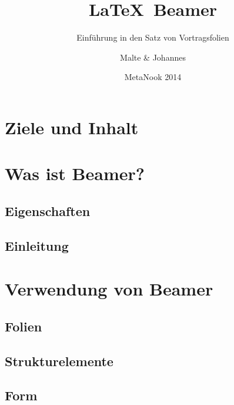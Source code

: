 \title{\LaTeX\ Beamer}
\subtitle{Einführung in den Satz von Vortragsfolien}
\author{Malte \& Johannes}
\date{MetaNook 2014}


  \section*{Ziele und Inhalt}

  \frame{}

  \section{Was ist Beamer?}

  \frame{}

  \subsection{Eigenschaften}

  \frame{}\frame{}\frame{}\frame{}

  \subsection{Einleitung}

  \frame{}\frame{}\frame{}

  \section{Verwendung von Beamer}

  \frame{}\frame{}\frame{}

  \subsection{Folien}

  \frame{}\frame{}\frame{}\frame{}\frame{}

  \subsection{Strukturelemente}

  \frame{}\frame{}\frame{}

  \subsection{Form}

  \frame{}\frame{}

